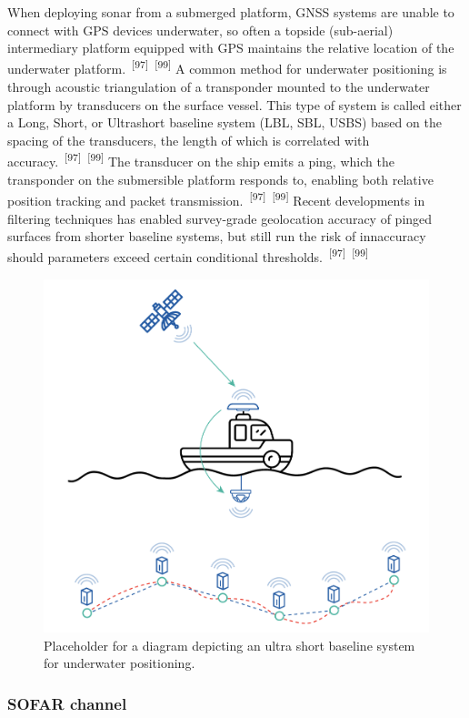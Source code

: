 \documentclass{article}
\begin{document}
\par{When deploying sonar from a submerged platform, GNSS systems are unable to connect with GPS devices underwater, so often a topside (sub-aerial) intermediary platform equipped with GPS maintains the relative location of the underwater platform.~\textsuperscript{[97]}~\textsuperscript{[99]} A common method for underwater positioning is through acoustic triangulation of a transponder mounted to the underwater platform by transducers on the surface vessel. This type of system is called either a Long, Short, or Ultrashort baseline system (LBL, SBL, USBS) based on the spacing of the transducers, the length of which is correlated with accuracy.~\textsuperscript{[97]}~\textsuperscript{[99]} The transducer on the ship emits a ping, which the transponder on the submersible platform responds to, enabling both relative position tracking and packet transmission.~\textsuperscript{[97]}~\textsuperscript{[99]} Recent developments in filtering techniques has enabled survey-grade geolocation accuracy of pinged surfaces from shorter baseline systems, but still run the risk of innaccuracy should parameters exceed certain conditional thresholds.~\textsuperscript{[97]}~\textsuperscript{[99]}}


\begin{figure}
    \centering
    \includegraphics[width=0.6\linewidth]{images/usbl.png}
    \caption{Placeholder for a diagram depicting an ultra short baseline system for underwater positioning.}
    \label{figure26}
\end{figure}

\subsubsection{SOFAR channel}
\end{document}
